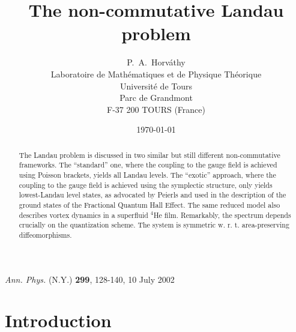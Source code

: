 \documentclass[a4paper,11pt]{article}
\let\ssection=\section
\renewcommand{\section}{\setcounter{equation}{0}\ssection}
\begin{document}
\setlength{\baselineskip}{16pt}

\title{The non-commutative Landau problem\\[8pt]
}
\author{
P.~A.~Horv\'athy
\\
Laboratoire de Math\'ematiques et de Physique Th\'eorique\\
Universit\'e de Tours\\
Parc de Grandmont\\
F-37 200 TOURS (France)
}

\date{\today}

\maketitle


\begin{abstract}
     The Landau problem is discussed in two similar but still different
     non-commuta\-tive frameworks. The ``standard'' one, where the
     coupling to the
     gauge field is achieved using Poisson brackets, yields
     all Landau levels. The  ``exotic'' approach, where the coupling to the
     gauge field is achieved using the symplectic structure,
     only yields lowest-Landau level states,
     as advocated by Peierls and used in
     the description of the ground states of the Fractional Quantum Hall
Effect.
     The same reduced model also describes
     vortex dynamics in a superfluid ${}^4$He film.
     Remarkably, the spectrum  depends crucially on the quantization
     scheme. The system is symmetric w. r. t. area-preserving diffeomorphisms.
\end{abstract}

\noindent
{\sl Ann. Phys.} (N.Y.) {\bf 299}, 128-140, 10 July 2002

\goodbreak


\section{Introduction}
\end{document}

